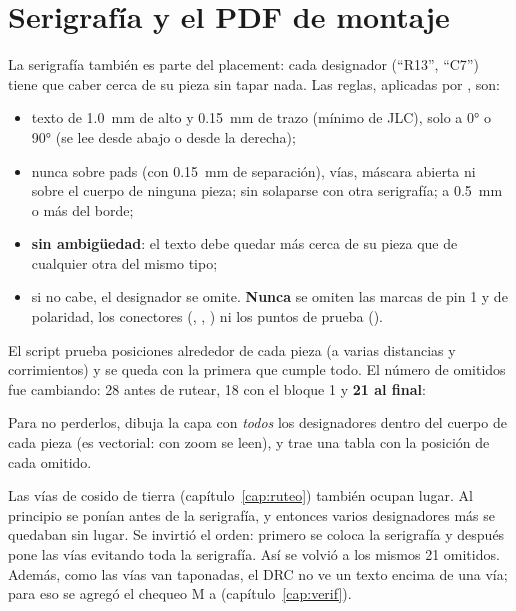\section{Serigrafía y el PDF de montaje}\label{sec:c07-serigrafia}

La serigrafía también es parte del placement: cada designador (``R13'', ``C7'') tiene que caber cerca de su pieza
sin tapar nada. Las reglas, aplicadas por , son:
\begin{itemize}
  \item texto de \SI{1.0}{\milli\meter} de alto y \SI{0.15}{\milli\meter} de trazo (mínimo de JLC), solo a \ang{0} o
        \ang{90} (se lee desde abajo o desde la derecha);
  \item nunca sobre pads (con \SI{0.15}{\milli\meter} de separación), vías, máscara abierta ni sobre el cuerpo de
        ninguna pieza; sin solaparse con otra serigrafía; a \SI{0.5}{\milli\meter} o más del borde;
  \item \textbf{sin ambigüedad}: el texto debe quedar más cerca de su pieza que de cualquier otra del mismo tipo;
  \item si no cabe, el designador se omite. \textbf{Nunca} se omiten las marcas de pin 1 y de polaridad, los
        conectores (, , ) ni los puntos de prueba ().
\end{itemize}

El script prueba posiciones alrededor de cada pieza (a varias distancias y corrimientos) y se queda con la primera que
cumple todo. El número de omitidos fue cambiando: 28 antes de rutear, 18 con el bloque 1 y \textbf{21 al final}:
\begin{center}
          
         
\end{center}

Para no perderlos,  dibuja la capa  con \emph{todos} los designadores
dentro del cuerpo de cada pieza (es vectorial: con zoom se leen), y  trae una tabla con
la posición de cada omitido.

\begin{ojo}
Las vías de cosido de tierra (capítulo~\ref{cap:ruteo}) también ocupan lugar. Al principio se ponían antes de la
serigrafía, y entonces varios designadores más se quedaban sin lugar. Se invirtió el orden: primero se coloca la
serigrafía y después  pone las vías evitando toda la serigrafía. Así se volvió a los mismos 21
omitidos. Además, como
las vías van taponadas, el DRC no ve un texto encima de una vía; para eso se agregó el chequeo M a
 (capítulo~\ref{cap:verif}).
\end{ojo}

